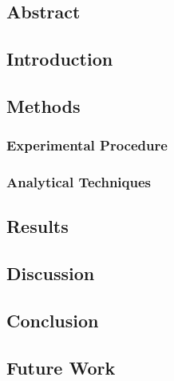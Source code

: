 \documentclass[12pt]{article}
\begin{document}
\subsection{Abstract}
\begin{doublespacing}


\subsection{Introduction}



\subsection{Methods}

\subsubsection*{Experimental Procedure}


\subsubsection*{Analytical Techniques}


\subsection{Results}




\subsection{Discussion}

       
\subsection{Conclusion}  
 

\subsection{Future Work}



\end{doublespacing}
\end{document}
